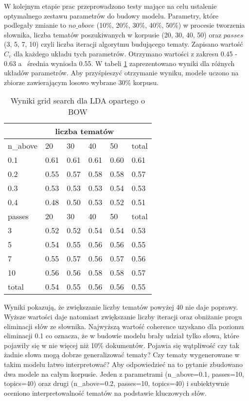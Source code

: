 \documentclass[a4paper,11pt,twoside]{report}
\theoremstyle{definition}
\begin{document}
W kolejnym etapie prac przeprowadzono testy mające na celu ustalenie optymalnego zestawu parametrów do budowy modelu. Parametry, które podlegały zmianie to $no\_above$ (10\%, 20\%, 30\%, 40\%, 50\%) w procesie tworzenia słownika, liczba tematów poszukiwanych w korpusie (20, 30, 40, 50) oraz $passes$ (3, 5, 7, 10) czyli liczba iteracji algorytmu budującego tematy. Zapisano wartość $C_v$ dla każdego układu tych parametrów. Otrzymano wartości z zakresu 0.45 - 0.63 a~ średnia wyniosła 0.55. W tabeli \ref{gs01} zaprezentowano wyniki dla różnych układów parametrów. Aby przyśpieszyć otrzymanie wyniku, modele uczono na zbiorze zawierającym losowo wybrane 30\% korpusu.

\begin{table}  \centering
\begin{tabular}{ |p{2cm}||p{2cm}|p{2cm}|p{2cm}|p{2cm}||p{2cm}| }
 \hline
      &  \multicolumn{4}{|c||}{liczba tematów} &    \\

 \hline
 n\_above & 20 & 30 & 40 & 50 & total \\
 \hline
0.1	&0.61	&0.61	&0.61	&0.60 	&0.61 \\
0.2	&0.55	&0.57	&0.58	&0.58	&0.57\\
0.3	&0.53	&0.53	&0.53	&0.54	&0.53\\
0.4	&0.48	&0.50	&0.53	&0.52	&0.51\\
 \hline \hline
passes & 20 & 30 & 40 & 50 & total \\
\hline
3	&0.52	&0.52	&0.54	&0.54	&0.53\\
5	&0.54	&0.55	&0.56	&0.56	&0.55\\
7	&0.55	&0.57	&0.56	&0.57	&0.56\\
10	&0.56	&0.56	&0.58	&0.58	&0.57\\
\hline \hline
total &	0.54	&0.55	&0.56	&0.56	&0.55\\
\hline
\end{tabular} \caption{Wyniki grid search dla LDA opartego o BOW} \label{gs01}
\end{table}

Wyniki pokazują, że zwiększanie liczby tematów powyżej 40 nie daje poprawy. Wyższe wartości daje natomiast zwiększanie liczby iteracji oraz obniżanie progu eliminacji słów ze słownika. Najwyższą wartość coherence uzyskano dla poziomu eliminacji 0.1 co oznacza, że w budowie modelu brały udział tylko słowa, które pojawiły się w nie więcej niż 10\% dokumentów. Pojawia się wątpliwość czy tak żadnie słowa mogą dobrze generalizować tematy? Czy tematy wygenerowane w takim modelu łatwo interpretować? Aby odpowiedzieć na to pytanie zbudowano dwa modele na całym korpusie. Jeden z parametrami (n\_above=0.1, passes=10, topics=40) oraz drugi (n\_above=0.2, passes=10, topics=40) i subiektywnie oceniono interpretowalność tematów na podstawie kluczowych słów.
\end{document}
